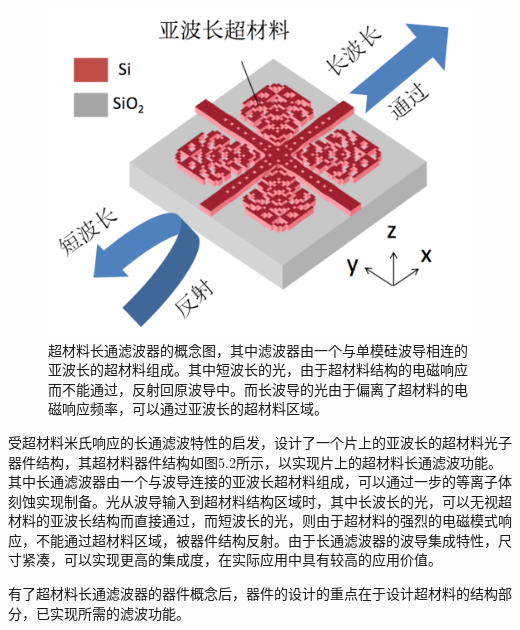 \begin{figure}[!htbp]
    \centering
    \includegraphics[width=1\textwidth]{Img/5-2.png}
    \caption{超材料长通滤波器的概念图，其中滤波器由一个与单模硅波导相连的亚波长的超材料组成。其中短波长的光，由于超材料结构的电磁响应而不能通过，反射回原波导中。而长波导的光由于偏离了超材料的电磁响应频率，可以通过亚波长的超材料区域。}
    \label{fig:5-2}
\end{figure}


受超材料米氏响应的长通滤波特性的启发，设计了一个片上的亚波长的超材料光子器件结构，其超材料器件结构如图5.2所示，以实现片上的超材料长通滤波功能。其中长通滤波器由一个与波导连接的亚波长超材料组成，可以通过一步的等离子体刻蚀实现制备。光从波导输入到超材料结构区域时，其中长波长的光，可以无视超材料的亚波长结构而直接通过，而短波长的光，则由于超材料的强烈的电磁模式响应，不能通过超材料区域，被器件结构反射。由于长通滤波器的波导集成特性，尺寸紧凑，可以实现更高的集成度，在实际应用中具有较高的应用价值。

有了超材料长通滤波器的器件概念后，器件的设计的重点在于设计超材料的结构部分，已实现所需的滤波功能。

